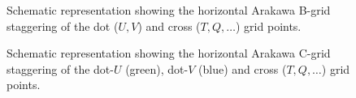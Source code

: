 \begin{figure}
\begin{center}
\caption{Schematic representation showing the horizontal Arakawa B-grid
staggering of the dot ($U,V$) and cross ($T,Q,\dots$) grid points.}
\label{mm5_grid}
\end{center}
\end{figure}

\begin{figure}
\begin{center}
\caption{Schematic representation showing the horizontal Arakawa C-grid
staggering of the dot-$U$ (green), dot-$V$ (blue) and cross ($T,Q,\dots$)
grid points.}
\label{mo_grid}
\end{center}
\end{figure}

